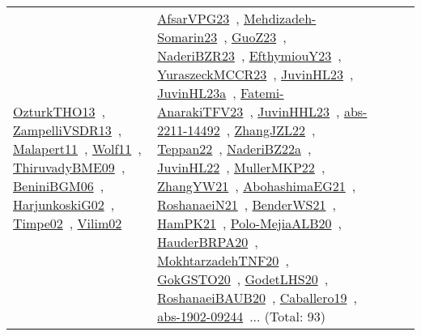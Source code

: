 {\begin{longtable}{lp{3cm}>{\raggedright\arraybackslash}p{6cm}>{\raggedright\arraybackslash}p{6cm}>{\raggedright\arraybackslash}p{8cm}}
\href{../works/OzturkTHO13.pdf}{OzturkTHO13}~\cite{OzturkTHO13}, \href{../works/ZampelliVSDR13.pdf}{ZampelliVSDR13}~\cite{ZampelliVSDR13}, \href{../works/Malapert11.pdf}{Malapert11}~\cite{Malapert11}, \href{../works/Wolf11.pdf}{Wolf11}~\cite{Wolf11}, \href{../works/ThiruvadyBME09.pdf}{ThiruvadyBME09}~\cite{ThiruvadyBME09}, \href{../works/BeniniBGM06.pdf}{BeniniBGM06}~\cite{BeniniBGM06}, \href{../works/HarjunkoskiG02.pdf}{HarjunkoskiG02}~\cite{HarjunkoskiG02}, \href{../works/Timpe02.pdf}{Timpe02}~\cite{Timpe02}, \href{../works/Vilim02.pdf}{Vilim02}~\cite{Vilim02} & \href{../works/AfsarVPG23.pdf}{AfsarVPG23}~\cite{AfsarVPG23}, \href{../works/Mehdizadeh-Somarin23.pdf}{Mehdizadeh-Somarin23}~\cite{Mehdizadeh-Somarin23}, \href{../works/GuoZ23.pdf}{GuoZ23}~\cite{GuoZ23}, \href{../works/NaderiBZR23.pdf}{NaderiBZR23}~\cite{NaderiBZR23}, \href{../works/EfthymiouY23.pdf}{EfthymiouY23}~\cite{EfthymiouY23}, \href{../works/YuraszeckMCCR23.pdf}{YuraszeckMCCR23}~\cite{YuraszeckMCCR23}, \href{../works/JuvinHL23.pdf}{JuvinHL23}~\cite{JuvinHL23}, \href{../works/JuvinHL23a.pdf}{JuvinHL23a}~\cite{JuvinHL23a}, \href{../works/Fatemi-AnarakiTFV23.pdf}{Fatemi-AnarakiTFV23}~\cite{Fatemi-AnarakiTFV23}, \href{../works/JuvinHHL23.pdf}{JuvinHHL23}~\cite{JuvinHHL23}, \href{../works/abs-2211-14492.pdf}{abs-2211-14492}~\cite{abs-2211-14492}, \href{../works/ZhangJZL22.pdf}{ZhangJZL22}~\cite{ZhangJZL22}, \href{../works/Teppan22.pdf}{Teppan22}~\cite{Teppan22}, \href{../works/NaderiBZ22a.pdf}{NaderiBZ22a}~\cite{NaderiBZ22a}, \href{../works/JuvinHL22.pdf}{JuvinHL22}~\cite{JuvinHL22}, \href{../works/MullerMKP22.pdf}{MullerMKP22}~\cite{MullerMKP22}, \href{../works/ZhangYW21.pdf}{ZhangYW21}~\cite{ZhangYW21}, \href{../works/AbohashimaEG21.pdf}{AbohashimaEG21}~\cite{AbohashimaEG21}, \href{../works/RoshanaeiN21.pdf}{RoshanaeiN21}~\cite{RoshanaeiN21}, \href{../works/BenderWS21.pdf}{BenderWS21}~\cite{BenderWS21}, \href{../works/HamPK21.pdf}{HamPK21}~\cite{HamPK21}, \href{../works/Polo-MejiaALB20.pdf}{Polo-MejiaALB20}~\cite{Polo-MejiaALB20}, \href{../works/HauderBRPA20.pdf}{HauderBRPA20}~\cite{HauderBRPA20}, \href{../works/MokhtarzadehTNF20.pdf}{MokhtarzadehTNF20}~\cite{MokhtarzadehTNF20}, \href{../works/GokGSTO20.pdf}{GokGSTO20}~\cite{GokGSTO20}, \href{../works/GodetLHS20.pdf}{GodetLHS20}~\cite{GodetLHS20}, \href{../works/RoshanaeiBAUB20.pdf}{RoshanaeiBAUB20}~\cite{RoshanaeiBAUB20}, \href{../works/Caballero19.pdf}{Caballero19}~\cite{Caballero19}, \href{../works/abs-1902-09244.pdf}{abs-1902-09244}~\cite{abs-1902-09244}... (Total: 93)\\

\end{longtable}}
